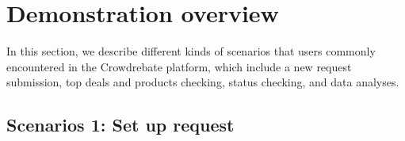 \section{Demonstration overview}

In this section, we describe different kinds of scenarios that users commonly encountered in the Crowdrebate platform, which include a new request submission, top deals and products checking, status checking, and data analyses.

\subsection{Scenarios 1: Set up request}

\begin{figure}[t!] \vspace{-1ex}
\end{figure}
